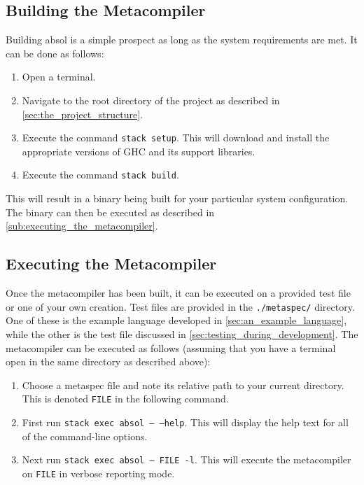 \subsection{Building the Metacompiler} %
\label{sub:building_the_metacompiler}
Building \gls{absol} is a simple prospect as long as the system requirements are met.
It can be done as follows:
\begin{enumerate}
    \item Open a terminal.
    \item Navigate to the root directory of the project as described in \autoref{sec:the_project_structure}.
    \item Execute the command \texttt{stack setup}. This will download and install the appropriate versions of GHC and its support libraries. 
    \item Execute the command \texttt{stack build}. 
\end{enumerate}

This will result in a binary being built for your particular system configuration.
The binary can then be executed as described in \autoref{sub:executing_the_metacompiler}.


\subsection{Executing the Metacompiler} %
\label{sub:executing_the_metacompiler}
Once the metacompiler has been built, it can be executed on a provided test file or one of your own creation.
Test files are provided in the \texttt{./metaspec/} directory. 
One of these is the example language developed in \autoref{sec:an_example_language}, while the other is the test file discussed in \autoref{sec:testing_during_development}.
The metacompiler can be executed as follows (assuming that you have a terminal open in the same directory as described above):
\begin{enumerate}
    \item Choose a metaspec file and note its relative path to your current directory. 
    This is denoted \texttt{FILE} in the following command.
    \item First run \texttt{stack exec absol -- --help}. 
    This will display the help text for all of the command-line options.
    \item Next run \texttt{stack exec absol -- FILE -l}.
    This will execute the metacompiler on \texttt{FILE} in verbose reporting mode. 
\end{enumerate}

